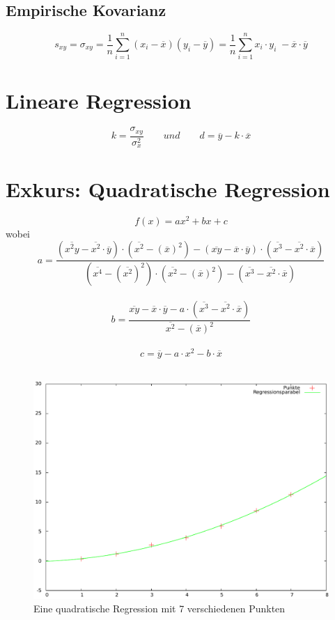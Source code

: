 \documentclass[12pt,a4paper]{scrbook}
\begin{document}
\subsection{Empirische Kovarianz}
\[ s_{xy} = \sigma_{xy} = \frac{1}{n} \sum_{i=1}^n (x_i - \overline{x})(y_i - \overline{y}) = \frac{1}{n} \sum_{i=1}^n x_i \cdot y_i \; - \overline{x} \cdot \overline{y} \]

\section{Lineare Regression}
\[ k = \frac{\sigma_{xy}}{\sigma^2_x} \quad \quad und \quad \quad d = \overline{y} - k \cdot \overline{x} \]

\section{Exkurs: Quadratische Regression}
\[ f(x) = ax^2 + bx + c \]
wobei
\[ a = \frac{\left(\overline{x^2y} - \overline{x^2} \cdot \overline{y}\right) \cdot \left( \overline{x^2} - \left(\overline{x}\right)^2 \right) - \left(\overline{xy} - \overline{x} \cdot \overline{y}\right) \cdot \left(\overline{x^3} - \overline{x^2} \cdot \overline{x}\right)}{\left(\overline{x^4} - \left(\overline{x^2}\right)^2 \right) \cdot \left( \overline{x^2} - \left(\overline{x}\right)^2 \right) - \left(\overline{x^3} - \overline{x^2} \cdot \overline{x}\right)} \]
\\
\[ b = \frac{\overline{xy} - \overline{x} \cdot \overline{y} - a \cdot \left( \overline{x^3} - \overline{x^2} \cdot \overline{x} \right)}{\overline{x^2} - \left(\overline{x} \right)^2} \]
\\
\[ c = \overline{y} - a \cdot {x^2} - b \cdot \overline{x} \]
\\

\begin{figure}[h]
	\centering
	\includegraphics[scale=0.8]{img/quad_regression.pdf}
	\caption{Eine quadratische Regression mit 7 verschiedenen Punkten}
\end{figure}
\end{document}
